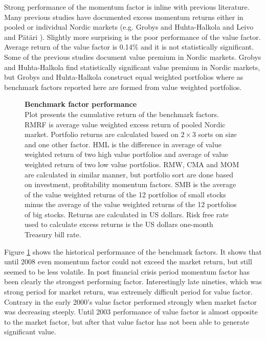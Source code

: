 \documentclass{article}
\begin{document}
Strong performance of the momentum factor is inline with previous literature. Many previous studies have documented excess momentum returns either in pooled or individual Nordic markets (e.g. Grobys and Huhta-Halkola \citeyear{grobys} and Leivo and Pätäri \citeyear{leivo2011}). Slightly more surprising is the poor performance of the value factor. Average return of the value factor is 0.14\% and it is not statistically significant. Some of the previous studies document value premium in Nordic markets. Grobys and Huhta-Halkola \citeyear{grobys} find statistically significant value premium in Nordic markets, but Grobys and Huhta-Halkola construct equal weighted portfolios where as benchmark factors reported here are formed from value weighted portfolios. \par

\begin{figure}[ht]
\centering
\caption[Benchmark factor performance]{\textbf{Benchmark factor performance}\\ Plot presents the cumulative return of the benchmark factors. RMRF is average value weighted excess return of pooled Nordic market. Portfolio returns are calculated based on $2 \times 3$ sorts on size and one other factor. HML is the difference in average of value weighted return of two high value portfolios and average of value weighted return of two low value portfolios. RMW, CMA and MOM are calculated in similar manner, but portfolio sort are done based on investment, profitability momentum factors. SMB is the average of the value weighted returns of the 12 portfolios of small stocks minus the average of the value weighted returns of the 12 portfolios of big stocks. Returns are calculated in US dollars. Risk free rate used to calculate excess returns is the US dollars one-month Treasury bill rate.}

\label{plot:factor_performance}
\end{figure}

Figure \ref{plot:factor_performance} shows the historical performance of the benchmark factors. It shows that until 2008 even momentum factor could not exceed the market return, but still seemed to be less volatile. In post financial crisis period momentum factor has been clearly the strongest performing factor. Interestingly late nineties, which was strong period for market return, was extremely difficult period for value factor. Contrary in the early 2000's value factor performed strongly when market factor was decreasing steeply. Until 2003 performance of value factor is almost opposite to the market factor, but after that value factor has not been able to generate significant value. \par
\end{document}
